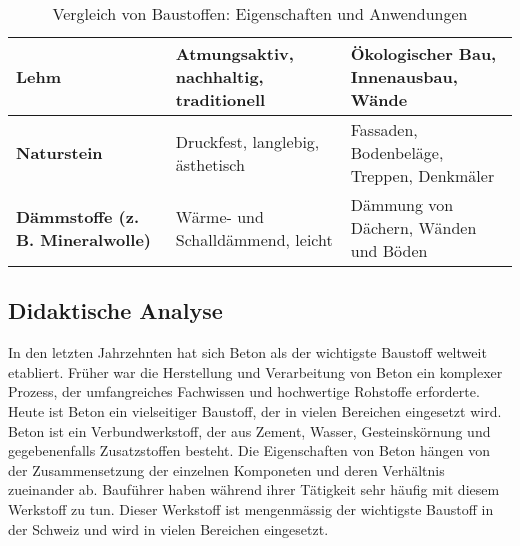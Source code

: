 \documentclass[
11pt,
captions=tableheading,
smallheadings,
headsepline,
footsepline, 
captions=tableheading,
parskip=half-,
]{scrartcl}
\begin{document}
\begin{table}[h!]
\begin{tabular}{p{3.5cm}p{4cm}p{7cm}}
        \midrule
        \textbf{Lehm}                                                   &
        Atmungsaktiv, nachhaltig, traditionell                          &
        Ökologischer Bau, Innenausbau, Wände                                                                                   \\
        \midrule
        \textbf{Naturstein}                                             &
        Druckfest, langlebig, ästhetisch                                &
        Fassaden, Bodenbeläge, Treppen, Denkmäler                                                                              \\
        \midrule
        \textbf{Dämmstoffe (z. B. Mineralwolle)}                        &
        Wärme- und Schalldämmend, leicht                                &
        Dämmung von Dächern, Wänden und Böden                                                                                  \\
        \bottomrule
    \end{tabular}
    \caption{Vergleich von Baustoffen: Eigenschaften und Anwendungen}
    \label{tab:baumaterialien}
\end{table}





\subsection{Didaktische Analyse}
In den letzten Jahrzehnten hat sich Beton als der wichtigste Baustoff weltweit etabliert. Früher war die Herstellung und Verarbeitung von Beton ein komplexer Prozess, der umfangreiches Fachwissen und hochwertige Rohstoffe erforderte. Heute ist Beton ein vielseitiger Baustoff, der in vielen Bereichen eingesetzt wird. Beton ist ein Verbundwerkstoff, der aus Zement, Wasser, Gesteinskörnung und gegebenenfalls Zusatzstoffen besteht. Die Eigenschaften von Beton hängen von der Zusammensetzung der einzelnen Komponeten und deren Verhältnis zueinander ab.
Bauführer haben während ihrer Tätigkeit sehr häufig mit diesem Werkstoff zu tun.
Dieser Werkstoff ist mengenmässig der wichtigste Baustoff in der Schweiz und wird in vielen Bereichen eingesetzt.
\end{document}
